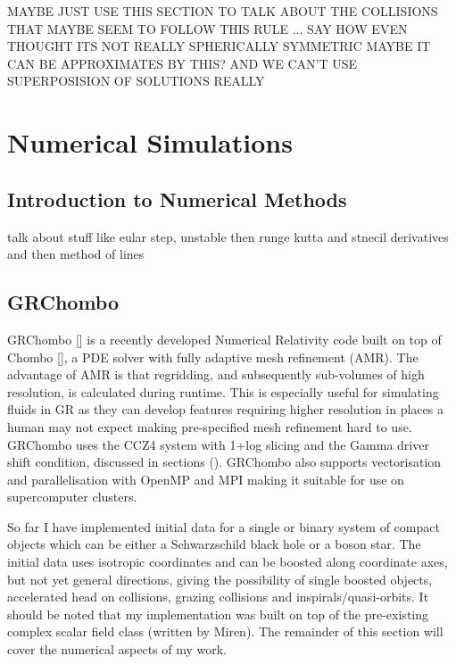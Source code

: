 \documentclass[11pt, oneside]{report}  %
\numberwithin{equation}{section}
\begin{document}
MAYBE JUST USE THIS SECTION TO TALK ABOUT THE COLLISIONS THAT MAYBE SEEM TO FOLLOW THIS RULE ... SAY HOW EVEN THOUGHT ITS NOT REALLY SPHERICALLY SYMMETRIC MAYBE IT CAN BE APPROXIMATES BY THIS? AND WE CAN'T USE SUPERPOSISION OF SOLUTIONS REALLY 













\section{Numerical Simulations}
\subsection{Introduction to Numerical Methods}

talk about stuff like eular step, unstable then runge kutta and stnecil derivatives and then method of lines



\subsection{GRChombo}
GRChombo [] is a recently developed Numerical Relativity code built on top of Chombo [], a PDE solver with fully adaptive mesh refinement (AMR). The advantage of AMR is that regridding, and subsequently sub-volumes of high resolution, is calculated during runtime. This is especially useful for simulating fluids in GR as they can develop features requiring higher resolution in places a human may not expect making pre-specified mesh refinement hard to use. GRChombo uses the CCZ4 system with 1+log slicing and the Gamma driver shift condition, discussed in sections (). GRChombo also supports vectorisation and parallelisation with OpenMP and MPI making it suitable for use on supercomputer clusters. 

So far I have implemented initial data for a single or binary system of compact objects which can be either a Schwarzschild black hole or a boson star. The initial data uses isotropic coordinates and can be boosted along coordinate axes, but not yet general directions, giving the possibility of single boosted objects, accelerated head on collisions, grazing collisions and inspirals/quasi-orbits. It should be noted that my implementation was built on top of the pre-existing complex scalar field class (written by Miren). The remainder of this section will cover the numerical aspects of my work.
\end{document}
